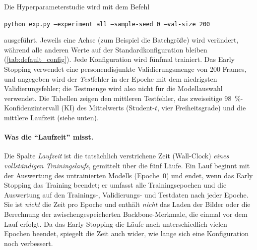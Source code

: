\documentclass[
  11pt,
  a4paper,
  oneside,
  DIV=12,
  BCOR=8mm,
  parskip=half,
  headings=normal,
  bibliography=totoc,
  listof=totoc
]{scrreprt}
\newcommand{\code}[1]{\texttt{#1}}
\begin{document}
Die Hyperparameterstudie wird mit dem Befehl
\begin{center}
  \code{python exp.py --experiment all --sample-seed 0 --val-size 200}
\end{center}
ausgeführt. Jeweils eine Achse (zum Beispiel die Batchgröße) wird verändert,
während alle anderen Werte auf der Standardkonfiguration bleiben
(\cref{tab:default_config}). Jede Konfiguration wird fünfmal trainiert. Das
Early Stopping verwendet eine personendisjunkte Validierungsmenge von 200
Frames, und angegeben wird der \emph{Test}fehler in der Epoche mit dem
niedrigsten Validierungsfehler; die Testmenge wird also nicht für die
Modellauswahl verwendet. Die Tabellen zeigen den mittleren Testfehler, das
zweiseitige \SI{98}{\percent}-Konfidenzintervall (KI) des Mittelwerts
(Student-$t$, vier Freiheitsgrade) und die mittlere Laufzeit (siehe unten).

\paragraph{Was die \enquote{Laufzeit} misst.} Die Spalte \emph{Laufzeit}
ist die tatsächlich verstrichene Zeit (Wall-Clock) \emph{eines vollständigen
Trainingslaufs}, gemittelt über die fünf Läufe. Ein Lauf beginnt mit der
Auswertung des untrainierten Modells (Epoche~0) und endet, wenn das Early
Stopping das Training beendet; er umfasst alle Trainingsepochen und die
Auswertung auf den Trainings-, Validierungs- und Testdaten nach jeder Epoche.
Sie ist \emph{nicht} die Zeit pro Epoche und enthält \emph{nicht} das Laden
der Bilder oder die Berechnung der zwischengespeicherten Backbone-Merkmale,
die einmal vor dem Lauf erfolgt. Da das Early Stopping die Läufe nach
unterschiedlich vielen Epochen beendet, spiegelt die Zeit auch wider, wie
lange sich eine Konfiguration noch verbessert.
\end{document}
